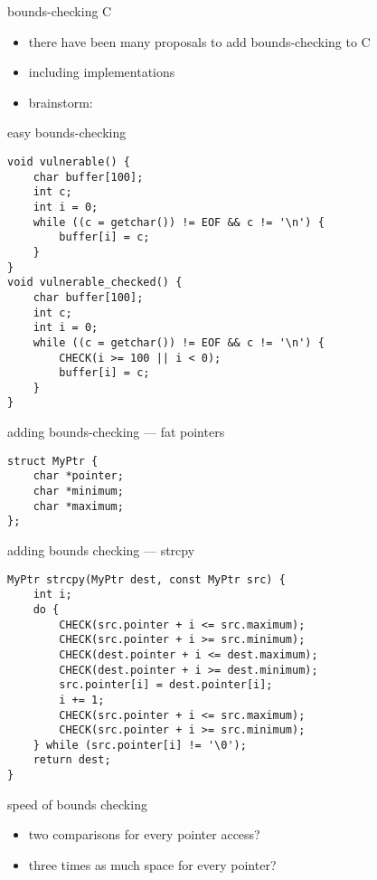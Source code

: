 \begin{frame}{bounds-checking C}
    \begin{itemize}
    \item there have been many proposals to add bounds-checking to C
    \item including implementations
    \item brainstorm: 
    \end{itemize}
\end{frame}

\begin{frame}[fragile,label=addBounds]{easy bounds-checking}
    \lstset{language=C,style=smaller}
\begin{lstlisting}
void vulnerable() {
    char buffer[100];
    int c;
    int i = 0;
    while ((c = getchar()) != EOF && c != '\n') {
        buffer[i] = c;
    }
}
void vulnerable_checked() {
    char buffer[100];
    int c;
    int i = 0;
    while ((c = getchar()) != EOF && c != '\n') {
        CHECK(i >= 100 || i < 0);
        buffer[i] = c;
    }
}
\end{lstlisting}
\end{frame}

\begin{frame}[fragile,label=wrappedPointers]{adding bounds-checking --- fat pointers}
\lstset{
    language=C,
    style=small
}
\begin{lstlisting}
struct MyPtr {
    char *pointer;
    char *minimum;
    char *maximum;
};
\end{lstlisting}
\end{frame}

\begin{frame}[fragile,label=wrappedPtrStrcpy]{adding bounds checking --- strcpy}
\lstset{
    language=C,
    style=small
}
\begin{lstlisting}
MyPtr strcpy(MyPtr dest, const MyPtr src) {
    int i;
    do {
        CHECK(src.pointer + i <= src.maximum);
        CHECK(src.pointer + i >= src.minimum);
        CHECK(dest.pointer + i <= dest.maximum);
        CHECK(dest.pointer + i >= dest.minimum);
        src.pointer[i] = dest.pointer[i];
        i += 1;
        CHECK(src.pointer + i <= src.maximum);
        CHECK(src.pointer + i >= src.minimum);
    } while (src.pointer[i] != '\0');
    return dest;
}
\end{lstlisting}
\end{frame}

\begin{frame}{speed of bounds checking}
    \begin{itemize}
    \item two comparisons for every pointer access?
    \item three times as much space for every pointer?
    \end{itemize}
\end{frame}

